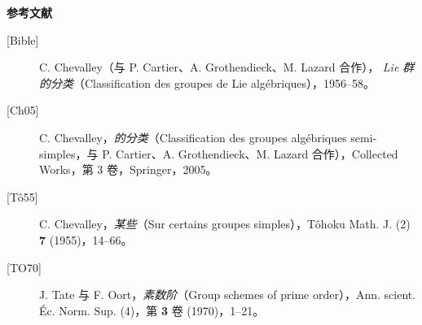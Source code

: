 \textbf{参考文献}
\begin{description}
\item[{[Bible]}] C. Chevalley（与 P. Cartier、A. Grothendieck、M. Lazard 合作），\emph{ Lie 群的分类}（Classification des groupes de Lie algébriques），1956--58。
\item[{[Ch05]}] C. Chevalley，\emph{的分类}（Classification des groupes algébriques semi-simples，与 P. Cartier、A. Grothendieck、M. Lazard 合作），Collected Works，第 3 卷，Springer，2005。
\item[{[Tô55]}] C. Chevalley，\emph{某些}（Sur certains groupes simples），Tôhoku Math. J. (2) \textbf{7} (1955)，14--66。
\item[{[TO70]}] J. Tate 与 F. Oort，\emph{素数阶}（Group schemes of prime order），Ann. scient. Éc. Norm. Sup. (4)，第 \textbf{3} 卷 (1970)，1--21。
\end{description}
